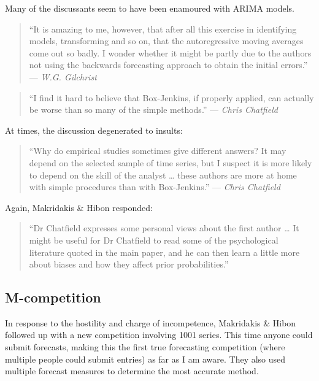 \documentclass[11pt,a4paper,]{article}
\begin{document}
Many of the discussants seem to have been enamoured with ARIMA models.

\begin{quote}
``It is amazing to me, however, that after all this exercise in identifying models, transforming and so on, that the autoregressive moving averages come out so badly. I wonder whether it might be partly due to the authors not using the backwards forecasting approach to obtain the initial errors.'' --- \emph{W.G. Gilchrist}
\end{quote}

\begin{quote}
``I find it hard to believe that Box-Jenkins, if properly applied, can actually be worse than so many of the simple methods.'' --- \emph{Chris Chatfield}
\end{quote}

At times, the discussion degenerated to insults:

\begin{quote}
``Why do empirical studies sometimes give different answers? It may depend on the selected sample of time series, but I suspect it is more likely to depend on the skill of the analyst \ldots{} these authors are more at home with simple procedures than with Box-Jenkins.'' --- \emph{Chris Chatfield}
\end{quote}

Again, Makridakis \& Hibon responded:

\begin{quote}
``Dr Chatfield expresses some personal views about the first author \ldots{} It might be useful for Dr Chatfield to read some of the psychological literature quoted in the main paper, and he can then learn a little more about biases and how they affect prior probabilities.''
\end{quote}

\hypertarget{m-competition}{%
\subsection*{M-competition}\label{m-competition}}

In response to the hostility and charge of incompetence, Makridakis \& Hibon followed up with a new competition involving 1001 series. This time anyone could submit forecasts, making this the first true forecasting competition (where multiple people could submit entries) as far as I am aware. They also used multiple forecast measures to determine the most accurate method.
\end{document}
